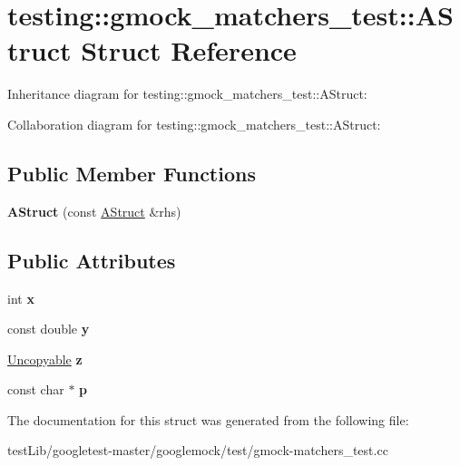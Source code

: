 \hypertarget{structtesting_1_1gmock__matchers__test_1_1AStruct}{}\section{testing\+:\+:gmock\+\_\+matchers\+\_\+test\+:\+:A\+Struct Struct Reference}
\label{structtesting_1_1gmock__matchers__test_1_1AStruct}


Inheritance diagram for testing\+:\+:gmock\+\_\+matchers\+\_\+test\+:\+:A\+Struct\+:


Collaboration diagram for testing\+:\+:gmock\+\_\+matchers\+\_\+test\+:\+:A\+Struct\+:
\subsection*{Public Member Functions}
\begin{DoxyCompactItemize}
\item 
\mbox{\label{structtesting_1_1gmock__matchers__test_1_1AStruct_ac5b9c0054e929e8883e13123aef50ff3}} 
{\bfseries A\+Struct} (const \hyperlink{structtesting_1_1gmock__matchers__test_1_1AStruct}{A\+Struct} \&rhs)
\end{DoxyCompactItemize}
\subsection*{Public Attributes}
\begin{DoxyCompactItemize}
\item 
\mbox{\label{structtesting_1_1gmock__matchers__test_1_1AStruct_a539eea02599ad34ff2bf90cc2c1adf26}} 
int {\bfseries x}
\item 
\mbox{\label{structtesting_1_1gmock__matchers__test_1_1AStruct_a08b8592764aa4775c3d5a3542470f8bb}} 
const double {\bfseries y}
\item 
\mbox{\label{structtesting_1_1gmock__matchers__test_1_1AStruct_a45b1006e4a7b21037610a385dcae6d8c}} 
\hyperlink{classtesting_1_1gmock__matchers__test_1_1Uncopyable}{Uncopyable} {\bfseries z}
\item 
\mbox{\label{structtesting_1_1gmock__matchers__test_1_1AStruct_a65755db7d763d53c13483bb520f1efcd}} 
const char $\ast$ {\bfseries p}
\end{DoxyCompactItemize}


The documentation for this struct was generated from the following file\+:\begin{DoxyCompactItemize}
\item 
test\+Lib/googletest-\/master/googlemock/test/gmock-\/matchers\+\_\+test.\+cc\end{DoxyCompactItemize}
